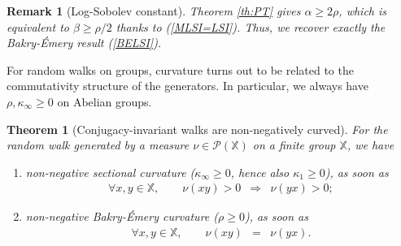 \documentclass[12pt,final]{article}
\newtheorem{theorem}{Theorem}[section]
\newtheorem{remark}{Remark}[section]
\numberwithin{equation}{section}
\newcommand{\dX}{\mathbb{X}}
\newcommand{\cP}{\mathcal{P}}
\begin{document}
\begin{remark}[Log-Sobolev constant] Theorem \ref{th:PT} gives $\alpha\ge  2\rho$, which is equivalent to $\beta\ge \rho/2$ thanks to (\ref{MLSI=LSI}). Thus, we recover exactly the Bakry-\'Emery result (\ref{BELSI}).
\end{remark}
For random walks on groups, curvature turns out to be related to the commutativity structure of the generators. In particular, we always have $\rho,\kappa_\infty\ge 0$ on Abelian groups.
\begin{theorem}[Conjugacy-invariant walks are non-negatively curved]\label{th:CIW} For the random walk generated  by a measure $\nu\in\cP(\dX)$ on a finite group  $\dX$, we have
\begin{enumerate}
\item non-negative sectional curvature ($\kappa_\infty\ge 0$, hence also $\kappa_1\ge 0$), as soon as 
\begin{eqnarray}
\label{def:CIsupp}
\forall x,y\in\dX,\qquad \nu(xy)>0 & \Longrightarrow & \nu(yx)>0;
\end{eqnarray} 
\item non-negative Bakry-\'Emery curvature ($\rho\ge 0$), as soon as 
\begin{eqnarray}
\label{def:CI}
\forall x,y\in\dX,\qquad \nu(xy) & = & \nu(yx).
\end{eqnarray}
\end{enumerate}
\end{theorem}
\end{document}
